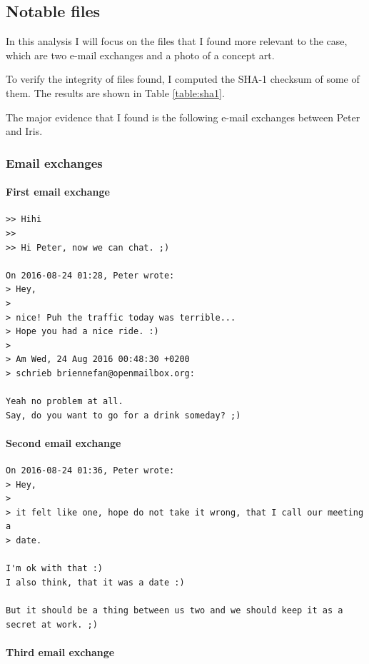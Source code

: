 \documentclass[12pt]{article}
\begin{document}
\subsection{Notable files}

In this analysis I will focus on the files that I found more relevant to the case, which are two e-mail exchanges and a photo of a concept art.

To verify the integrity of files found, I computed the SHA-1 checksum of some of them. The results are shown in Table \ref{table:sha1}.

The major evidence that I found is the following e-mail exchanges between Peter and Iris.

\subsubsection{Email exchanges}

\paragraph{First email exchange}
\label{sec:first-mail}

\begin{verbatim}
>> Hihi
>> 
>> Hi Peter, now we can chat. ;)

On 2016-08-24 01:28, Peter wrote:
> Hey,
> 
> nice! Puh the traffic today was terrible...
> Hope you had a nice ride. :)
> 
> Am Wed, 24 Aug 2016 00:48:30 +0200
> schrieb briennefan@openmailbox.org:

Yeah no problem at all.
Say, do you want to go for a drink someday? ;)
\end{verbatim}

\paragraph{Second email exchange}

\begin{verbatim}
On 2016-08-24 01:36, Peter wrote:
> Hey,
> 
> it felt like one, hope do not take it wrong, that I call our meeting a
> date.

I'm ok with that :)
I also think, that it was a date :)

But it should be a thing between us two and we should keep it as a 
secret at work. ;)
\end{verbatim}

\paragraph{Third email exchange}
\end{document}
